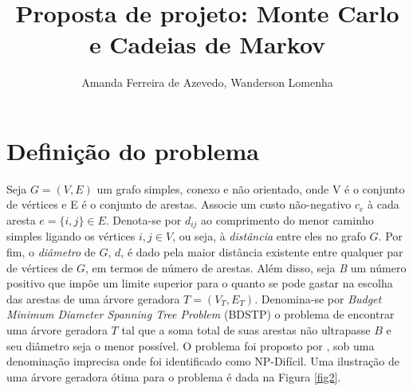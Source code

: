 \documentclass[12pt]{article}
\title{Proposta de projeto: Monte Carlo e Cadeias de Markov}
\author{Amanda Ferreira de Azevedo\inst{1}, Wanderson Lomenha\inst{1}}
\begin{document}
 

\maketitle

%     

\section{Definição do problema}


Seja $G = (V, E)$ um grafo simples, conexo e não orientado, onde V é o conjunto de vértices e E é o conjunto de arestas. Associe um custo não-negativo $c_e$ à cada aresta $e = \{i,j\} \in E$. Denota-se por $d_{ij}$ ao comprimento do menor caminho simples ligando os vértices $i,j \in V$, ou seja, à \textit{distância} entre eles no grafo $G$. Por fim, o \textit{diâmetro} de $G$, $d$, é dado pela maior distância existente entre qualquer par de vértices de $G$, em termos de número de arestas. Além disso, seja \textit{B} um número positivo que impõe um limite superior para o quanto se pode gastar na escolha das arestas de uma árvore geradora $T = (V_T, E_T)$. Denomina-se por \textit{Budget Minimum Diameter Spanning Tree Problem} (BDSTP) o problema de encontrar uma árvore geradora $T$ tal que a soma total de suas arestas não ultrapasse $B$ e seu diâmetro seja o menor possível. O problema foi proposto por \cite{Plesnik1981}, sob uma denominação imprecisa onde foi identificado como NP-Difícil. Uma ilustração de uma árvore geradora ótima para o problema é dada na Figura \ref{fig2}. 
\end{document}
